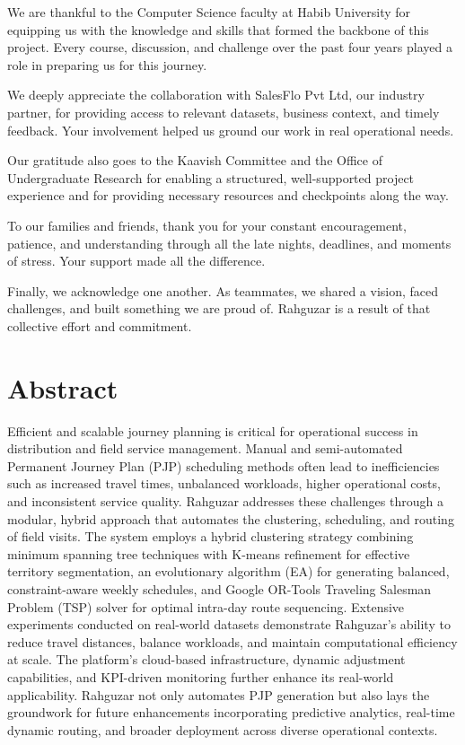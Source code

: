 \documentclass[12pt,twosided]{report}
\begin{document}
We are thankful to the Computer Science faculty at Habib University for equipping us with the knowledge and skills that formed the backbone of this project. Every course, discussion, and challenge over the past four years played a role in preparing us for this journey.

We deeply appreciate the collaboration with SalesFlo Pvt Ltd, our industry partner, for providing access to relevant datasets, business context, and timely feedback. Your involvement helped us ground our work in real operational needs.

Our gratitude also goes to the Kaavish Committee and the Office of Undergraduate Research for enabling a structured, well-supported project experience and for providing necessary resources and checkpoints along the way.

To our families and friends, thank you for your constant encouragement, patience, and understanding through all the late nights, deadlines, and moments of stress. Your support made all the difference.

Finally, we acknowledge one another. As teammates, we shared a vision, faced challenges, and built something we are proud of. Rahguzar is a result of that collective effort and commitment.



\chapter*{Abstract}
Efficient and scalable journey planning is critical for operational success in distribution and field service management. Manual and semi-automated Permanent Journey Plan (PJP) scheduling methods often lead to inefficiencies such as increased travel times, unbalanced workloads, higher operational costs, and inconsistent service quality. Rahguzar addresses these challenges through a modular, hybrid approach that automates the clustering, scheduling, and routing of field visits. The system employs a hybrid clustering strategy combining minimum spanning tree techniques with K-means refinement for effective territory segmentation, an evolutionary algorithm (EA) for generating balanced, constraint-aware weekly schedules, and Google OR-Tools Traveling Salesman Problem (TSP) solver for optimal intra-day route sequencing. Extensive experiments conducted on real-world datasets demonstrate Rahguzar’s ability to reduce travel distances, balance workloads, and maintain computational efficiency at scale. The platform's cloud-based infrastructure, dynamic adjustment capabilities, and KPI-driven monitoring further enhance its real-world applicability. Rahguzar not only automates PJP generation but also lays the groundwork for future enhancements incorporating predictive analytics, real-time dynamic routing, and broader deployment across diverse operational contexts.
\end{document}
